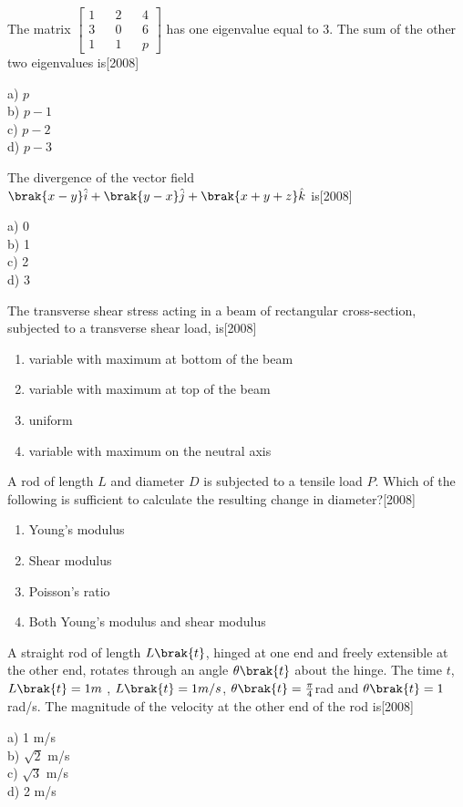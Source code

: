 \item The matrix $\begin{bmatrix}1 && 2 && 4 \\ 3 && 0 && 6\\1 && 1 && p\end{bmatrix}$ has one eigenvalue equal to 3. The sum of the other two eigenvalues is\hfill{[2008]}
\begin{multicols}{4}
    a) $p$\\
    b) $p-1$\\
    c) $p-2$\\
    d) $p-3$
\end{multicols}
\item The divergence of the vector field $\brak{x-y}\hat{i}
+\brak{y-x}\hat{j}+\brak{x+y+z}\hat{k}
$ is\hfill{[2008]}
\begin{multicols}{4}
    a) 0\\
    b) 1\\
    c) 2\\
    d) 3
\end{multicols}

\item The transverse shear stress acting in a beam of rectangular cross-section, subjected to a transverse shear load, is\hfill{[2008]}
\begin{enumerate}
    \item variable with maximum at bottom of the beam
    \item variable with maximum at top of the beam
    \item uniform
    \item variable with maximum on the neutral axis
\end{enumerate}
\item A rod of length $L$ and diameter $D$ is subjected to a tensile load $P$. Which of the following is sufficient to calculate the resulting change in diameter?\hfill{[2008]}
\begin{enumerate}
    \item Young's modulus
    \item Shear modulus
    \item Poisson's ratio
    \item Both Young's modulus and shear modulus
\end{enumerate}

\item A straight rod of length $L\brak{t}$, hinged at one end and freely extensible at the other end, rotates through an angle $\theta\brak{t}$ about the hinge. The time $t$, $L\brak{t}=1m$ , $L\brak{t}= 1 m/s$, $\theta\brak{t}=\frac{\pi}{4}$rad and $\theta\brak{t}= 1$rad/s. The magnitude of the velocity at the other end of the rod is\hfill{[2008]}
\begin{multicols}{4}
     a) 1 m/s\\
     b) $\sqrt{2}$ m/s\\
     c) $\sqrt{3}$ m/s\\
     d) 2 m/s
 \end{multicols}

